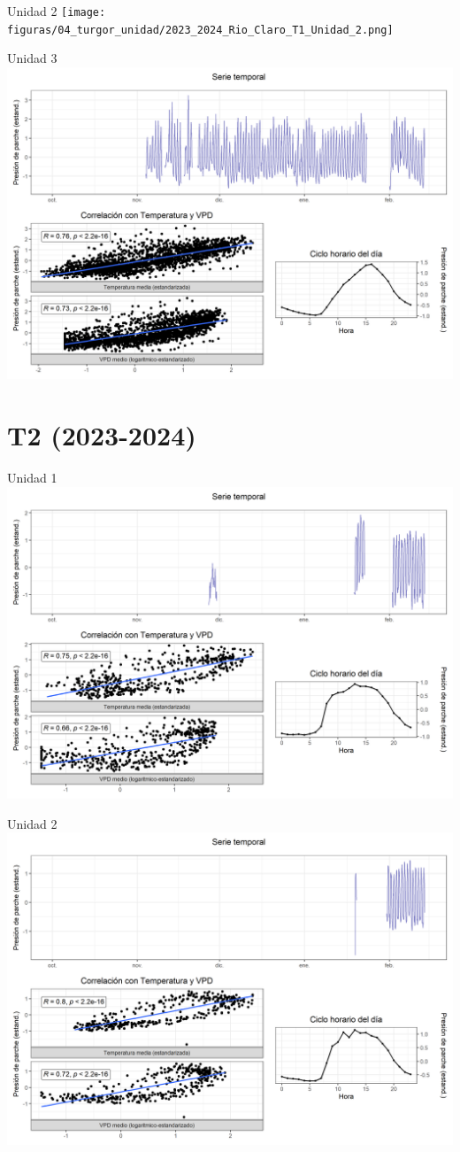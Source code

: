 \documentclass[
  letterpaper,
  DIV=11,
  numbers=noendperiod]{scrreprt}
\begin{document}
Unidad 2
\texttt{[image: figuras/04\_turgor\_unidad/2023\_2024\_Rio\_Claro\_T1\_Unidad\_2.png]}

Unidad 3
\includegraphics{figuras/04_turgor_unidad/2023_2024_Rio_Claro_T1_Unidad_3.png}

\chapter{T2 (2023-2024)}

Unidad 1
\includegraphics{figuras/04_turgor_unidad/2023_2024_Rio_Claro_T2_Unidad_1.png}

Unidad 2
\includegraphics{figuras/04_turgor_unidad/2023_2024_Rio_Claro_T2_Unidad_2.png}
\end{document}

